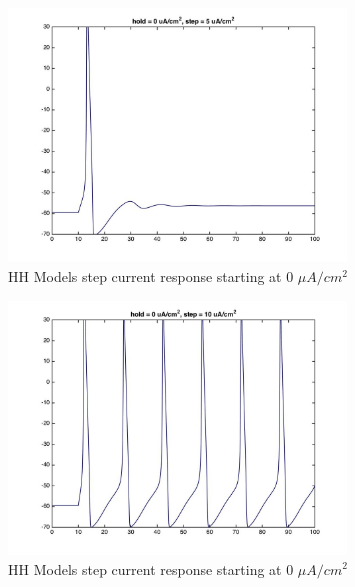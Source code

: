 \documentclass{beamer}
\begin{document}
\begin{frame}
  \begin{figure}
    \centering
    \includegraphics[width = 0.8\textwidth]{./images/current_0_5.jpg}
    \caption{HH Models step current response starting at 0 $\mu A/cm^2$}
  \end{figure}
\end{frame}


\begin{frame}
  \begin{figure}
    \centering
    \includegraphics[width = 0.8\textwidth]{./images/current_0_10.jpg}
    \caption{HH Models step current response starting at 0 $\mu A/cm^2$}
  \end{figure}
\end{frame}
\end{document}
